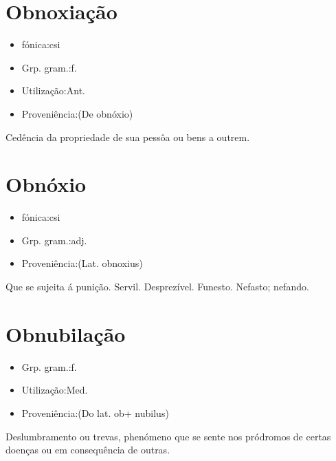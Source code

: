 \section{Obnoxiação}
\begin{itemize}
\item {fónica:csi}
\end{itemize}
\begin{itemize}
\item {Grp. gram.:f.}
\end{itemize}
\begin{itemize}
\item {Utilização:Ant.}
\end{itemize}
\begin{itemize}
\item {Proveniência:(De \textunderscore obnóxio\textunderscore )}
\end{itemize}
Cedência da propriedade de sua pessôa ou bens a outrem.
\section{Obnóxio}
\begin{itemize}
\item {fónica:csi}
\end{itemize}
\begin{itemize}
\item {Grp. gram.:adj.}
\end{itemize}
\begin{itemize}
\item {Proveniência:(Lat. \textunderscore obnoxius\textunderscore )}
\end{itemize}
Que se sujeita á punição.
Servil.
Desprezível.
Funesto.
Nefasto; nefando.
\section{Obnubilação}
\begin{itemize}
\item {Grp. gram.:f.}
\end{itemize}
\begin{itemize}
\item {Utilização:Med.}
\end{itemize}
\begin{itemize}
\item {Proveniência:(Do lat. \textunderscore ob\textunderscore  + \textunderscore nubilus\textunderscore )}
\end{itemize}
Deslumbramento ou trevas, phenómeno que se sente nos pródromos de certas doenças ou em consequência de outras.
